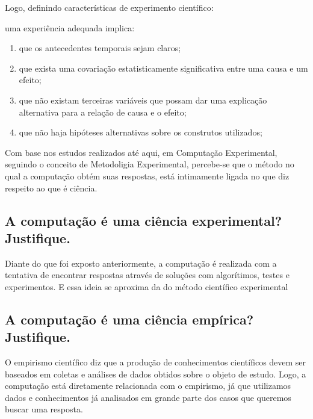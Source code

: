 Logo, definindo características de experimento científico:

uma experiência adequada implica:

\begin{enumerate}
    \item que os antecedentes temporais sejam claros;
    \item que exista uma covariação estatisticamente significativa entre uma causa e um efeito;
    \item que não existam terceiras variáveis que possam dar uma explicação alternativa para a relação de causa e o efeito;
    \item que não haja hipóteses alternativas sobre os construtos utilizados;
\end{enumerate}

Com base nos estudos realizados até aqui, em Computação Experimental, seguindo o conceito de Metodoligia Experimental, percebe-se que o método no qual a computação obtém suas respostas, está intimamente ligada no que diz respeito ao que é ciência.

\subsection{A computação é uma ciência experimental? Justifique. }
Diante do que foi exposto anteriormente, a computação é realizada com a tentativa de encontrar respostas através de soluções com algorítimos, testes e experimentos. E essa ideia se aproxima da do método científico experimental

\subsection{A computação é uma ciência empírica? Justifique. }

O empirismo científico diz que a produção de conhecimentos científicos devem ser baseados em coletas e análises de dados obtidos sobre o objeto de estudo. Logo, a computação está diretamente relacionada com o empirismo, já que utilizamos dados e conhecimentos já analisados em grande parte dos casos que queremos buscar uma resposta.